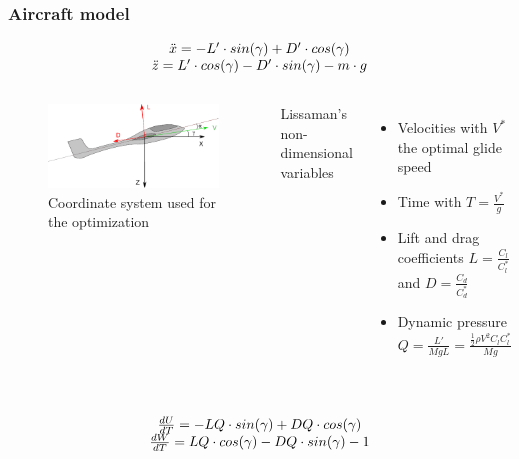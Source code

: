 \documentclass[compress]{beamer}
\begin{document}
\begin{frame}[shrink]
  \frametitle{Aircraft model}
  \begin{equation*}
    \begin{array}[c]{c}
      \ddot{x}= -L' \cdot sin(\gamma) + D' \cdot cos(\gamma) \\
      \ddot{z}= L' \cdot cos(\gamma) - D' \cdot sin(\gamma) - m \cdot g \\
    \end{array}
  \end{equation*}
  \begin{columns}
    \begin{figure}[h]
      \centering
      \includegraphics[width=1\textwidth]{./Figures/glider.eps}
      \caption{Coordinate system used for the optimization}
    \end{figure}
    Lissaman's non-dimensional variables
    \begin{itemize}
      \item Velocities with $V^{*}$ the optimal glide speed
      \item Time with $T=\frac{V^{*}}{g}$
      \item Lift and drag coefficients $L= \frac{C_l}{C_l^*}$ and $D= \frac{C_d}{C_d^*}$
      \item Dynamic pressure $Q = \frac{L'}{MgL} = \frac{\frac{1}{2} \rho V^2 C_l C_l^* }{Mg}$
    \end{itemize}
  \end{columns}
  \begin{equation*}
    \begin{array}[c]{c}
      \\
      \frac{dU}{dT}= -LQ \cdot sin(\gamma) + DQ \cdot cos(\gamma) \\
      \frac{dW}{dT}= LQ \cdot cos(\gamma) - DQ \cdot sin(\gamma) - 1
    \end{array}
  \end{equation*}
\end{frame}
\end{document}
